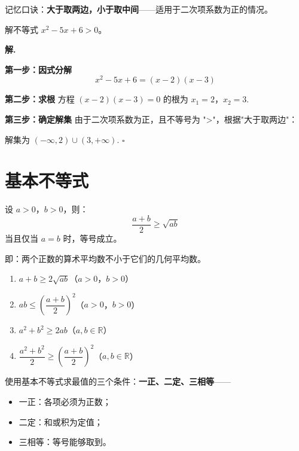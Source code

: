 \begin{note}
记忆口诀：\textbf{大于取两边，小于取中间}——适用于二次项系数为正的情况。
\end{note}

\begin{example}
解不等式 $x^2 - 5x + 6 > 0$。
\end{example}

\textbf{解.}

\textbf{第一步：因式分解}
\[ x^2 - 5x + 6 = (x - 2)(x - 3) \]

\textbf{第二步：求根}
方程 $(x-2)(x-3) = 0$ 的根为 $x_1 = 2$，$x_2 = 3$.

\textbf{第三步：确定解集}
由于二次项系数为正，且不等号为 ">"，根据"大于取两边"：

解集为 $(-\infty, 2) \cup (3, +\infty)$. \hfill $\square$

\section{基本不等式}

\begin{theorem}[基本不等式]
设 $a > 0$，$b > 0$，则：
\[ \frac{a + b}{2} \geq \sqrt{ab} \]
当且仅当 $a = b$ 时，等号成立。

即：两个正数的算术平均数不小于它们的几何平均数。
\end{theorem}

\begin{theorem}[基本不等式的变形]
\begin{enumerate}
    \item $a + b \geq 2\sqrt{ab}$（$a > 0$，$b > 0$）
    \item $ab \leq \left(\dfrac{a + b}{2}\right)^2$（$a > 0$，$b > 0$）
    \item $a^2 + b^2 \geq 2ab$（$a, b \in \mathbb{R}$）
    \item $\dfrac{a^2 + b^2}{2} \geq \left(\dfrac{a + b}{2}\right)^2$（$a, b \in \mathbb{R}$）
\end{enumerate}
\end{theorem}

\begin{note}
使用基本不等式求最值的三个条件：\textbf{一正、二定、三相等}——
\begin{itemize}
    \item 一正：各项必须为正数；
    \item 二定：和或积为定值；
    \item 三相等：等号能够取到。
\end{itemize}
\end{note}

